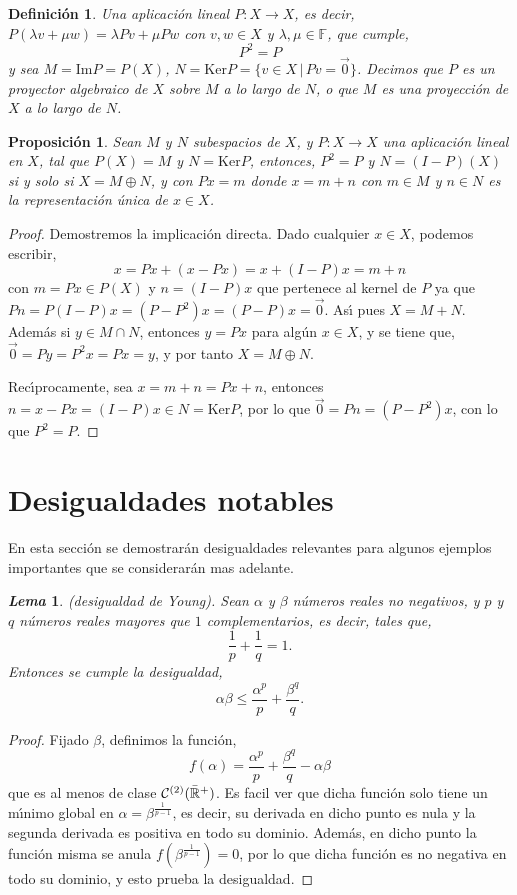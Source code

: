 \documentclass[12pt]{book}
\newtheorem{defn}{\bf Definición}[chapter]
\newtheorem{prop}{\bf Proposición}[chapter]
\newtheorem{lema}{\it Lema}[chapter]
\begin{document}
\begin{defn} Una aplicaci\'on lineal $P:X\longrightarrow X$, es decir,  $P(\lambda v+\mu 
w)=\lambda Pv+\mu Pw$ con $v,w\in X$ y $\lambda,\mu\in \mathbb{F}$, que cumple,
$$P^2=P$$
y sea $M=\textrm{Im}P=P(X)$, $N=\textrm{Ker}P=\{v\in X\,|\,Pv=\vec 0\}$. Decimos que $P$ es un 
proyector algebraico  de $X$ sobre $M$ a lo largo de $N$, o que $M$ es una proyecci\'on de $X$ a 
lo largo de $N$.
\end{defn}
\begin{prop} Sean $M$ y $N$ subespacios de $X$, y $P:X\longrightarrow X$ una aplicaci\'on lineal 
en $X$, tal que $P(X)=M$ y $N=\textrm{Ker}P$, entonces, $P^2=P$ y $N=(I-P)(X)$ si y solo si  
$X=M\oplus N$, y con  $Px=m$  donde  $x=m+n$ con $m\in M$ y $n\in N$ es la representaci\'on 
\'unica de $x\in X$.
\end{prop}
\begin{proof}
Demostremos la implicaci\'on directa. Dado cualquier $x\in X$, podemos escribir,
$$x= Px + (x-Px)=x+(I-P)x=m+n$$con $m=Px\in P(X)$ y $n=(I-P)x$ que pertenece al kernel de $P$ 
ya que $Pn= P(I-P)x=(P-P^2)x = (P-P)x=\vec 0$. As\'{\i} pues $X=M+N$. Adem\'as si $y\in M\cap 
N$, entonces $y=Px$ para alg\'un $x\in X$, y se tiene que, $\vec 0=   Py=P^2x=Px=y$, y por tanto 
$X=M\oplus N$.

Rec\'{\i}procamente, sea $x=m+n=Px +n$, entonces $n=x-Px=(I-P)x\in N=\textrm{Ker}P$, por lo 
que $\vec 0=Pn=(P-P^2)x$, con lo que $P^2=P$.
\end{proof}
 

\section{Desigualdades notables}
En esta secci\'on se demostrar\'an desigualdades relevantes para algunos ejemplos importantes 
que se considerar\'an mas adelante.

\begin{lema}(desigualdad de Young). Sean $\alpha$ y $\beta$ n\'umeros reales no negativos, y $p$ 
y $q$ n\'umeros reales mayores que $1$ complementarios,  es decir, tales que,
$$\frac{1}{p}+\frac{1}{q}=1.$$
Entonces se cumple la desigualdad,
 $$ \alpha\beta\leq \frac{\alpha^p}{p}+\frac{\beta^q}{q}.$$
\end{lema}
\begin{proof}
Fijado $\beta$, definimos la funci\'on,
$$f(\alpha) =\frac{\alpha^p}{p}+\frac{\beta^q}{q}-\alpha\beta$$
que es al menos  de clase ${\cal C}^{(2)}(\bar{\mathbb{R}}^+)$. Es facil ver que dicha funci\'on solo 
tiene un m\'{\i}nimo global  en $\alpha=\beta^{\frac{1}{p-1}}$, es decir, su derivada en dicho punto 
es nula y la segunda derivada  es positiva en todo su dominio. Adem\'as, en dicho punto la funci\'on 
misma se anula $f(\beta^{\frac{1}{p-1}})=0$, por lo que dicha funci\'on es no negativa en todo su 
dominio, y esto prueba la desigualdad.
\end{proof}
   
\end{document}
